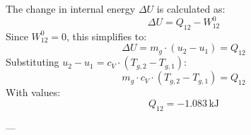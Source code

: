 The change in internal energy \( \Delta U \) is calculated as:  
\[
\Delta U = Q_{12} - W_{12}^0
\]  
Since \( W_{12}^0 = 0 \), this simplifies to:  
\[
\Delta U = m_g \cdot (u_2 - u_1) = Q_{12}
\]  
Substituting \( u_2 - u_1 = c_V \cdot (T_{g,2} - T_{g,1}) \):  
\[
m_g \cdot c_V \cdot (T_{g,2} - T_{g,1}) = Q_{12}
\]  
With values:  
\[
Q_{12} = -1.083 \, \text{kJ}
\]  

---